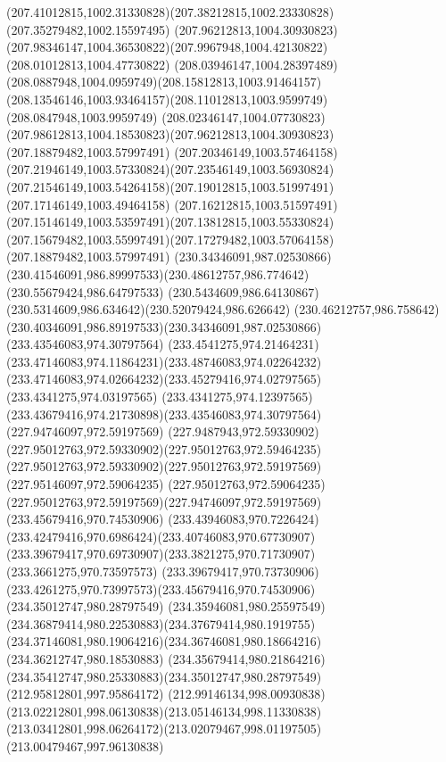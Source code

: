 {{	\curveto(207.41012815,1002.31330828)(207.38212815,1002.23330828)(207.35279482,1002.15597495)
	\moveto(207.96212813,1004.30930823)
	\curveto(207.98346147,1004.36530822)(207.9967948,1004.42130822)(208.01012813,1004.47730822)
	\curveto(208.03946147,1004.28397489)(208.0887948,1004.0959749)(208.15812813,1003.91464157)
	\curveto(208.13546146,1003.93464157)(208.11012813,1003.9599749)(208.0847948,1003.9959749)
	\curveto(208.02346147,1004.07730823)(207.98612813,1004.18530823)(207.96212813,1004.30930823)
	\moveto(207.18879482,1003.57997491)
	\curveto(207.20346149,1003.57464158)(207.21946149,1003.57330824)(207.23546149,1003.56930824)
	\curveto(207.21546149,1003.54264158)(207.19012815,1003.51997491)(207.17146149,1003.49464158)
	\curveto(207.16212815,1003.51597491)(207.15146149,1003.53597491)(207.13812815,1003.55330824)
	\curveto(207.15679482,1003.55997491)(207.17279482,1003.57064158)(207.18879482,1003.57997491)
	\moveto(230.34346091,987.02530866)
	\curveto(230.41546091,986.89997533)(230.48612757,986.774642)(230.55679424,986.64797533)
	\curveto(230.5434609,986.64130867)(230.5314609,986.634642)(230.52079424,986.626642)
	\curveto(230.46212757,986.758642)(230.40346091,986.89197533)(230.34346091,987.02530866)
	\moveto(233.43546083,974.30797564)
	\curveto(233.4541275,974.21464231)(233.47146083,974.11864231)(233.48746083,974.02264232)
	\curveto(233.47146083,974.02664232)(233.45279416,974.02797565)(233.4341275,974.03197565)
	\curveto(233.4341275,974.12397565)(233.43679416,974.21730898)(233.43546083,974.30797564)
	\moveto(227.94746097,972.59197569)
	\curveto(227.9487943,972.59330902)(227.95012763,972.59330902)(227.95012763,972.59464235)
	\curveto(227.95012763,972.59330902)(227.95012763,972.59197569)(227.95146097,972.59064235)
	\curveto(227.95012763,972.59064235)(227.95012763,972.59197569)(227.94746097,972.59197569)
	\moveto(233.45679416,970.74530906)
	\curveto(233.43946083,970.7226424)(233.42479416,970.6986424)(233.40746083,970.67730907)
	\curveto(233.39679417,970.69730907)(233.3821275,970.71730907)(233.3661275,970.73597573)
	\curveto(233.39679417,970.73730906)(233.4261275,970.73997573)(233.45679416,970.74530906)
	\moveto(234.35012747,980.28797549)
	\curveto(234.35946081,980.25597549)(234.36879414,980.22530883)(234.37679414,980.1919755)
	\curveto(234.37146081,980.19064216)(234.36746081,980.18664216)(234.36212747,980.18530883)
	\curveto(234.35679414,980.21864216)(234.35412747,980.25330883)(234.35012747,980.28797549)
	\moveto(212.95812801,997.95864172)
	\curveto(212.99146134,998.00930838)(213.02212801,998.06130838)(213.05146134,998.11330838)
	\curveto(213.03412801,998.06264172)(213.02079467,998.01197505)(213.00479467,997.96130838)
}}
